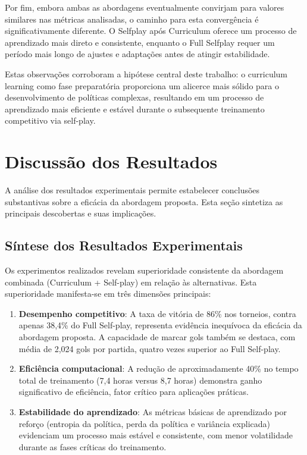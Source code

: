 Por fim, embora ambas as abordagens eventualmente convirjam para valores similares nas métricas analisadas, o caminho para esta convergência é significativamente diferente. O Selfplay após Curriculum oferece um processo de aprendizado mais direto e consistente, enquanto o Full Selfplay requer um período mais longo de ajustes e adaptações antes de atingir estabilidade.

Estas observações corroboram a hipótese central deste trabalho: o curriculum learning como fase preparatória proporciona um alicerce mais sólido para o desenvolvimento de políticas complexas, resultando em um processo de aprendizado mais eficiente e estável durante o subsequente treinamento competitivo via self-play.

\section{Discussão dos Resultados}
\label{sec:discussao_resultados}

A análise dos resultados experimentais permite estabelecer conclusões substantivas sobre a eficácia da abordagem proposta. Esta seção sintetiza as principais descobertas e suas implicações.

\subsection{Síntese dos Resultados Experimentais}

Os experimentos realizados revelam superioridade consistente da abordagem combinada (Curriculum + Self-play) em relação às alternativas. Esta superioridade manifesta-se em três dimensões principais:

\begin{enumerate}
    \item \textbf{Desempenho competitivo}: A taxa de vitória de 86\% nos torneios, contra apenas 38,4\% do Full Self-play, representa evidência inequívoca da eficácia da abordagem proposta. A capacidade de marcar gols também se destaca, com média de 2,024 gols por partida, quatro vezes superior ao Full Self-play.

    \item \textbf{Eficiência computacional}: A redução de aproximadamente 40\% no tempo total de treinamento (7,4 horas versus 8,7 horas) demonstra ganho significativo de eficiência, fator crítico para aplicações práticas.

    \item \textbf{Estabilidade do aprendizado}: As métricas básicas de aprendizado por reforço (entropia da política, perda da política e variância explicada) evidenciam um processo mais estável e consistente, com menor volatilidade durante as fases críticas do treinamento.
\end{enumerate}

